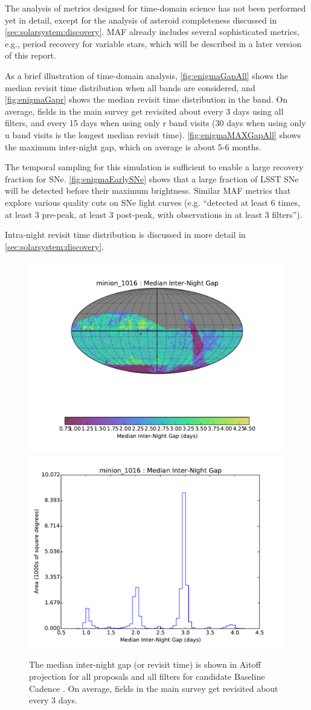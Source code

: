 The analysis of metrics designed for time-domain science has not been
performed yet in detail, except for the analysis of asteroid
completeness discussed in \autoref{sec:solarsystem:discovery}. MAF already includes
several sophisticated metrics, e.g., period recovery for variable
stars, which will be described in a later version of this report.

As a brief illustration of time-domain analysis,
\autoref{fig:enigmaGapAll} shows the median revisit time distribution
when all bands are considered, and \autoref{fig:enigmaGapr} shows the
median revisit time distribution in the band.  On average, fields in
the main survey get revisited about every 3 days using all filters,
and every 15 days when using only r band visits (30 days when using
only u band visits is the longest median revisit time).
\autoref{fig:enigmaMAXGapAll} shows the maximum inter-night gap, which
on average is about 5-6 months.

The temporal sampling for this simulation is sufficient to enable a
large recovery fraction for SNe. \autoref{fig:enigmaEarlySNe} shows
that a large fraction of LSST SNe will be detected before their
maximum brightness. Similar MAF metrics that explore various quality
cuts on SNe light curves (e.g. ``detected at least 6 times, at least 3
pre-peak, at least 3 post-peak, with observations in at least 3
filters'').

Intra-night revisit time distribution is discussed in more detail in
\autoref{sec:solarsystem:discovery}.


\begin{figure}[t!]
\vskip -0.0in
\includegraphics[angle=0,width=0.49\hsize,clip]{figs/cadence/minion_1016_Median_Inter-Night_Gap_HEAL_SkyMap.pdf}
\includegraphics[angle=0,width=0.49\hsize,clip]{figs/cadence/minion_1016_Median_Inter-Night_Gap_HEAL_Histogram.pdf}
\vskip -0.1in
\caption{The median inter-night gap (or revisit time) is shown in Aitoff projection
for all proposals and all filters for candidate Baseline Cadence .
On average, fields in the main survey get revisited about every 3 days.}
\label{fig:enigmaGapAll}
\end{figure}

